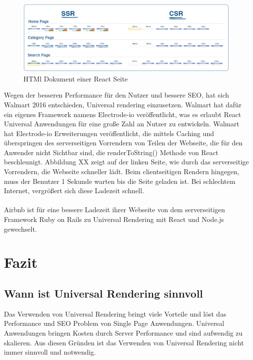 \documentclass[runningheads]{llncs}
\begin{document}
\begin{figure}
  \centering
  \includegraphics[width=12cm]{images/ssrvscsrwallmart}
  \caption{HTMl Dokument einer React Seite}
\end{figure}

Wegen der besseren Performance für den Nutzer und bessere SEO, 
hat sich Walmart 2016 entschieden, 
Universal rendering einzusetzen. 
Walmart hat dafür ein eigenes Framework namens Electrode-io veröffentlicht, 
was es erlaubt React Universal Anwendungen für eine große Zahl an Nutzer zu entwickeln. 
Walmart hat Electrode-io Erweiterungen veröffentlicht, 
die mittels Caching und überspringen des serverseitigen Vorrendern von Teilen der Webseite, 
die für den Anwender nicht Sichtbar sind, 
die renderToString() Methode von React beschleunigt. 
Abbildung XX zeigt auf der linken Seite, 
wie durch das serverseitige Vorrendern, 
die Webseite schneller lädt. Beim clientseitigen Rendern hingegen, 
muss der Benutzer 1 Sekunde warten bis die Seite geladen ist. 
Bei schlechtem Internet, vergrößert sich diese Ladezeit schnell.
\\
\\
Airbnb ist für eine bessere Ladezeit ihrer Webseite 
von dem serverseitigen Framework Ruby on Rails zu Universal Rendering mit React und Node.js gewechselt. 

\newpage

\section{Fazit}
\label{sec:Fazit}

\subsection{Wann ist Universal Rendering sinnvoll}
\label{subsec:Wann ist Universal Rendering sinnvoll}
Das Verwenden von Universal Rendering bringt viele Vorteile und 
löst das Performance und SEO Problem von Single Page Anwendungen. 
Universal Anwendungen bringen Kosten durch Server Performance und sind aufwendig zu skalieren. 
Aus diesen Gründen ist das Verwenden von Universal Rendering nicht immer sinnvoll und notwendig.
\end{document}
